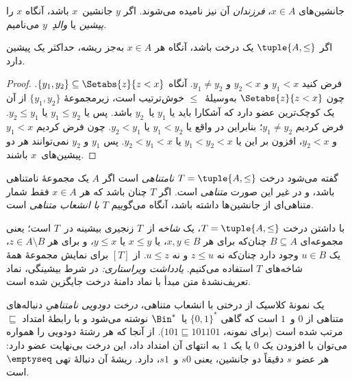 \documentclass[../../../include/open-logic-section]{subfiles}
\begin{document}
جانشین‌های $x \in A$، \emph{فرزندان} آن نیز نامیده می‌شوند. اگر
$y$ جانشین~$x$ باشد، آنگاه $x$ را \emph{پیشین} یا \emph{والدِ}~$y$
می‌نامیم.

\begin{prop}
اگر $\tuple{A,\le}$ یک درخت باشد، آنگاه هر $x \in A$ به‌جز ریشه،
حداکثر یک پیشین دارد.
\end{prop}

\begin{proof}
  فرض کنید $y_1 < x$ و $y_2 < x$ و $y_1 \neq y_2$. آنگاه $\{y_1,
  y_2\} \subseteq \Setabs{z}{z<x}$. چون $\Setabs{z}{z<x}$
  به‌وسیلهٔ~$\le$ خوش‌ترتیب است، زیرمجموعهٔ $\{y_1, y_2\}$ از آن یک
  کوچک‌ترین عضو دارد که آشکارا باید یا $y_1$ یا~$y_2$ باشد. پس یا
  $y_1 \le y_2$ یا $y_2 \le y_1$. فرض کردیم $y_1 \neq y_2$؛ بنابراین
  در واقع یا $y_1 < y_2$ یا $y_2 < y_1$. چون فرض کردیم $y_1 < x$ و
  $y_2 < x$، افزون بر این یا $y_1 < y_2
  < x$ یا $y_2 < y_1 < x$. پس $y_1$ و $y_2$ نمی‌توانند هر دو
  پیشین‌های~$x$ باشند.
\end{proof}

\begin{defn}
گفته می‌شود درخت $T = \tuple{A, \le}$ \emph{نامتناهی} است اگر $A$ یک
مجموعهٔ نامتناهی باشد، و در غیر این صورت \emph{متناهی} است. اگر $T$
چنان باشد که هر $x \in A$ فقط شمار متناهی‌ای از جانشین‌ها داشته باشد، آنگاه
می‌گوییم $T$ \emph{با انشعاب متناهی} است.
\end{defn}

\begin{defn}[شاخه‌ها]
با داشتن درخت $T = \tuple{A, \le}$، یک \emph{شاخه} از~$T$ زنجیری
بیشینه در~$T$ است؛ یعنی مجموعه‌ای $B \subseteq A$ چنان‌که برای هر
$x, y \in B$، یا $x \le y$ یا $y \le x$، و برای هر
$z \in A \setminus B$، یک $u \in B$ وجود دارد چنان‌که نه
$z \le u$ و نه $u \le z$.
%
از $[T]$ برای نمایش مجموعهٔ همهٔ شاخه‌های $T$ استفاده می‌کنیم.
\emph{یادداشت ویراستاری:} در شرط بیشینگی، نماد تعریف‌نشدهٔ متن مبدأ با نماد دامنهٔ درخت جایگزین شده است.
\end{defn}

\begin{ex}
یک نمونهٔ کلاسیک از درختی با انشعاب متناهی، \emph{درخت دودویی
نامتناهیِ} دنباله‌های متناهی از $0$ و~$1$ است که گاهی
$\{0,1\}^*$ یا~$\Bin^*$ نوشته می‌شود و با رابطهٔ امتداد $\sqsubseteq$
مرتب شده است (برای نمونه، $101 \sqsubseteq 101101$).
از آنجا که هر رشتهٔ دودویی را همواره می‌توان با افزودن
یک $0$ یا یک $1$ به انتهای آن امتداد داد، این درخت بی‌نهایت
عضو دارد: هر عضو~$s$ دقیقاً دو جانشین، یعنی $s0$ و~$s1$، دارد. ریشهٔ آن
دنبالهٔ تهی $\emptyseq$ است.
\end{ex}
\end{document}
